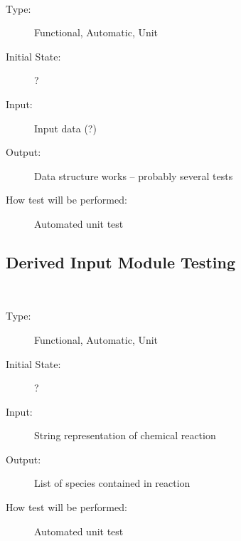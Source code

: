 \documentclass[12pt, titlepage]{article}
\newcounter{testnum} %
\begin{document}
\begin{addmargin}[2em]{0em}
\\
\begin{addmargin}[2em]{0em}
\begin{description}
\item[Type:] Functional, Automatic, Unit
					
\item[Initial State:] ?
					
\item[Input:] Input data (?)
					
\item[Output:] Data structure works -- probably several tests
					
\item[How test will be performed:] Automated unit test\\
\end{description}
\end{addmargin}
\end{addmargin}


\subsection{Derived Input Module Testing}

\begin{addmargin}[2em]{0em}
\\
\begin{addmargin}[2em]{0em}
\begin{description}
\item[Type:] Functional, Automatic, Unit
					
\item[Initial State:] ?
					
\item[Input:] String representation of chemical reaction
					
\item[Output:] List of species contained in reaction
					
\item[How test will be performed:] Automated unit test\\
\end{description}
\end{addmargin}
\end{addmargin}

%

\end{document}
